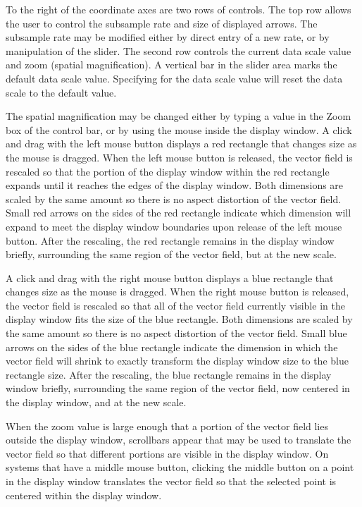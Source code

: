 To the right of the coordinate axes are two rows of controls.  The top
row allows the user to control the subsample rate and size of displayed
arrows.  The subsample rate may be modified either by direct entry of a
new rate, or by manipulation of the slider.  The second row controls the
current data scale value and zoom (spatial magnification).  A vertical
bar in the slider area marks the default data scale value.  Specifying
 for the data scale value will reset the data scale to the
default value.

The spatial magnification may be changed either by typing a value in the
Zoom box of the control bar, or by using the mouse inside the display
window.  A click and drag with the left mouse button displays a red
rectangle that changes size as the mouse is dragged.  When the left
mouse button is released, the vector field is rescaled so that the
portion of the display window within the red rectangle expands until it
reaches the edges of the display window.  Both dimensions are scaled by
the same amount so there is no aspect distortion of the vector field.
Small red arrows on the sides of the red rectangle indicate which
dimension will expand to meet the display window boundaries upon release
of the left mouse button.  After the rescaling, the red rectangle
remains in the display window briefly, surrounding the same region of
the vector field, but at the new scale.

A click and drag with the right mouse button displays a blue rectangle
that changes size as the mouse is dragged.  When the right mouse button
is released, the vector field is rescaled so that all of the vector
field currently visible in the display window fits the size of the
blue rectangle.  Both dimensions are scaled by the same amount so there
is no aspect distortion of the vector field.  Small blue arrows on the
sides of the blue rectangle indicate the dimension in which the vector
field will shrink to exactly transform the display window size to the
blue rectangle size.  After the rescaling, the blue rectangle remains in
the display window briefly, surrounding the same region of the vector
field, now centered in the display window, and at the new scale.

When the zoom value is large enough that a portion of the vector field
lies outside the display window, scrollbars appear that may be used to
translate the vector field so that different portions are visible in the
display window.  On systems that have a middle mouse button, clicking
the middle button on a point in the display window translates the vector
field so that the selected point is centered within the display window.

